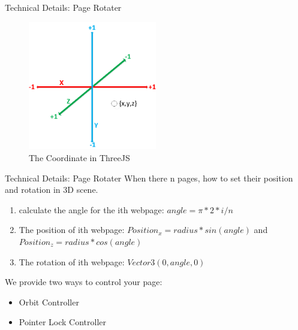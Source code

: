 \documentclass{beamer}
\begin{document}
\begin{frame}{Technical Details: Page Rotater}
\begin{center}
    \begin{figure}
        \includegraphics[width=0.5\textwidth]{./images/threejs_corodinate.png}
        \caption{The Coordinate in ThreeJS}
    \end{figure}
\end{center}
\end{frame}

\begin{frame}{Technical Details: Page Rotater}
When there n pages, how to set their position and rotation in 3D scene.
\begin{enumerate}
    \item calculate the angle for the ith webpage: $angle = \pi * 2 * i / n$
    \item The position of ith webpage: $Position_{x} = radius * sin(angle)$ and $Position_{z} = radius * cos(angle)$
    \item The rotation of ith webpage: $Vector3(0, angle, 0)$
\end{enumerate}
We provide two ways to control your page:
\begin{itemize}
    \item Orbit Controller
    \item Pointer Lock Controller
\end{itemize}
\end{frame}
\end{document}
